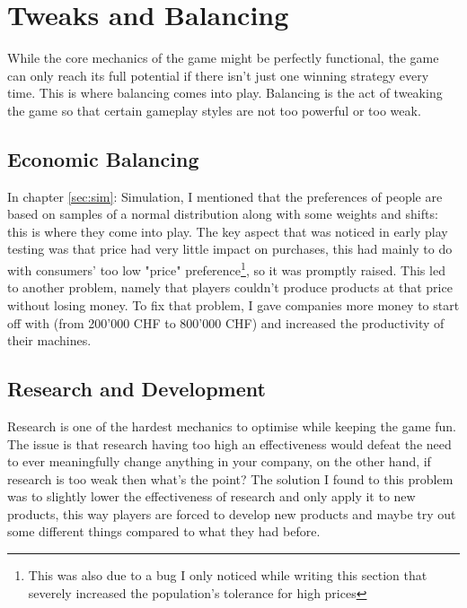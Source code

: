\section{Tweaks and Balancing}

While the core mechanics of the game might be perfectly functional, the game can only reach its full potential if there
isn't just one winning strategy every time. This is where balancing comes into play. Balancing is the act of tweaking
the game so that certain gameplay styles are not too powerful or too weak.

\subsection{Economic Balancing}

In chapter \ref{sec:sim}: Simulation, I mentioned that the preferences of people are based on samples of a normal
distribution along with some weights and shifts: this is where they come into play. The key aspect that was noticed
in early play testing was that price had very little impact on purchases, this had mainly to do with consumers' too low
"price" preference\footnote{This was also due to a bug I only noticed while writing this section that severely increased
	the population's tolerance for high prices}, so it was promptly raised. This led to another problem, namely that players
couldn't produce products at that price without losing money. To fix that problem, I gave companies more money to start
off with (from 200'000 CHF to 800'000 CHF) and increased the productivity of their machines.

\subsection{Research and Development}

Research is one of the hardest mechanics to optimise while keeping the game fun. The issue is that research having too
high an effectiveness would defeat the need to ever meaningfully change anything in your company, on the other hand, if
research is too weak then what's the point? The solution I found to this problem was to slightly lower the effectiveness
of research and only apply it to new products, this way players are forced to develop new products and maybe try out some
different things compared to what they had before.
